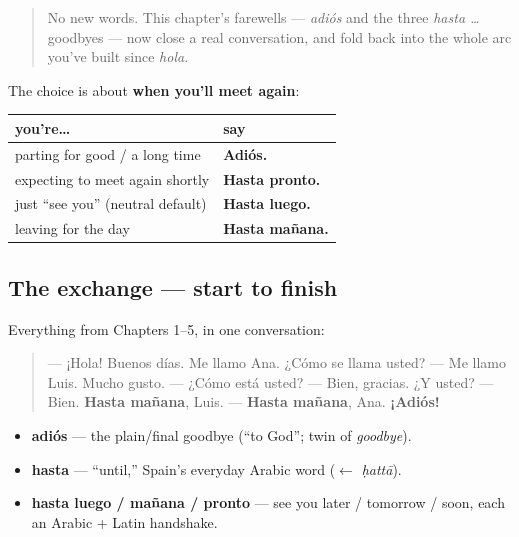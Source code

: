 \label{lesson:ES-C05-practice}



\begin{quote}
No new words. This chapter's farewells — \emph{adiós} and the three \emph{hasta …} goodbyes — now close a real conversation, and fold back into the whole arc you've built since \emph{hola}.
\end{quote}

\begin{grammarlens}[title={Grammar Lens: choosing the right goodbye}]
The choice is about \textbf{when you'll meet again}:

\noindent
\begin{tabularx}{\linewidth}{@{}>{\raggedright\arraybackslash}X>{\raggedright\arraybackslash}X@{}}
\toprule
\textbf{you're…} & \textbf{say} \\
\midrule
parting for good / a long time & \textbf{Adiós.} \\
expecting to meet again shortly & \textbf{Hasta pronto.} \\
just \textquotedblleft{}see you\textquotedblright{} (neutral default) & \textbf{Hasta luego.} \\
leaving for the day & \textbf{Hasta mañana.} \\
\bottomrule
\end{tabularx}
\end{grammarlens}

\subsection*{The exchange — start to finish}
Everything from Chapters 1–5, in one conversation:

\begin{quote}
— ¡Hola! Buenos días. Me llamo Ana. ¿Cómo se llama usted? — Me llamo Luis. Mucho gusto. — ¿Cómo está usted? — Bien, gracias. ¿Y usted? — Bien. \textbf{Hasta mañana}, Luis. — \textbf{Hasta mañana}, Ana. \textbf{¡Adiós!}
\end{quote}

\begin{grammarlens}[title={What you've built this chapter}]
\begin{itemize}
\raggedright
  \item \textbf{adiós} — the plain/final goodbye (\textquotedblleft{}to God\textquotedblright{}; twin of \emph{goodbye}).
  \item \textbf{hasta} — \textquotedblleft{}until,\textquotedblright{} Spain's everyday Arabic word ($\leftarrow$ \emph{ḥattā}).
  \item \textbf{hasta luego / mañana / pronto} — see you later / tomorrow / soon, each an Arabic + Latin handshake.
\end{itemize}
\end{grammarlens}

